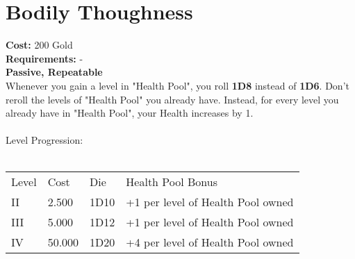 \section*{Bodily Thoughness}\label{sec:bodilythoughness}
\textbf{Cost:} 200 Gold\\
\textbf{Requirements:} -\\
\textbf{Passive, Repeatable}\\
Whenever you gain a level in "Health Pool", you roll \textbf{1D8} instead of \textbf{1D6}.
Don't reroll the levels of "Health Pool" you already have.
Instead, for every level you already have in "Health Pool", your Health increases by 1.\\
\\
Level Progression:\\
\\
\begin{tabular}{l | l | l | l}
    Level & Cost & Die & Health Pool Bonus\\
    II & 2.500 & 1D10 & +1 per level of Health Pool owned\\
    III & 5.000 & 1D12 & +1 per level of Health Pool owned\\
    IV & 50.000 & 1D20 & +4 per level of Health Pool owned\\
\end{tabular}